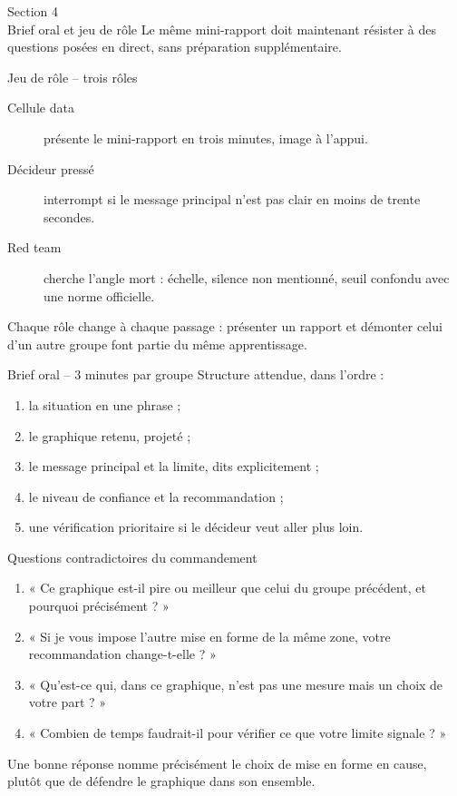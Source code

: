 \documentclass[aspectratio=169]{beamer}
\begin{document}
\begin{frame}[plain]
  \centering
  \Huge Section 4\\[3mm]
  \Large Brief oral et jeu de rôle
  \vfill
  \normalsize Le même mini-rapport doit maintenant résister à des questions posées en direct, sans préparation supplémentaire.
\end{frame}

\begin{frame}{Jeu de rôle -- trois rôles}
  \begin{description}
    \item[Cellule data] présente le mini-rapport en trois minutes, image à l'appui.
    \item[Décideur pressé] interrompt si le message principal n'est pas clair en moins de trente secondes.
    \item[Red team] cherche l'angle mort : échelle, silence non mentionné, seuil confondu avec une norme officielle.
  \end{description}
  \vfill
  \alert{Chaque rôle change à chaque passage : présenter un rapport et démonter celui d'un autre groupe font partie du même apprentissage.}
\end{frame}

\begin{frame}{Brief oral -- 3 minutes par groupe}
  Structure attendue, dans l'ordre :
  \begin{enumerate}
    \item la situation en une phrase ;
    \item le graphique retenu, projeté ;
    \item le message principal et la limite, dits explicitement ;
    \item le niveau de confiance et la recommandation ;
    \item une vérification prioritaire si le décideur veut aller plus loin.
  \end{enumerate}
\end{frame}

\begin{frame}{Questions contradictoires du commandement}
  \begin{enumerate}
    \item « Ce graphique est-il pire ou meilleur que celui du groupe précédent, et pourquoi précisément ? »
    \item « Si je vous impose l'autre mise en forme de la même zone, votre recommandation change-t-elle ? »
    \item « Qu'est-ce qui, dans ce graphique, n'est pas une mesure mais un choix de votre part ? »
    \item « Combien de temps faudrait-il pour vérifier ce que votre limite signale ? »
  \end{enumerate}
  \vfill
  \alert{Une bonne réponse nomme précisément le choix de mise en forme en cause, plutôt que de défendre le graphique dans son ensemble.}
\end{frame}
\end{document}
